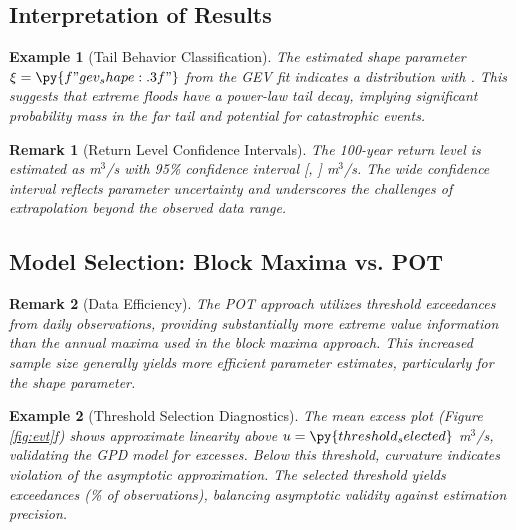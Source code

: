 \documentclass[a4paper, 11pt]{article}
\newtheorem{example}{Example}[section]
\newtheorem{remark}{Remark}[section]
\begin{document}
\subsection{Interpretation of Results}

\begin{example}[Tail Behavior Classification]
The estimated shape parameter $\xi = \py{f"{gev_shape:.3f}"}$ from the GEV fit indicates
a 
distribution with .
This suggests that extreme floods have a power-law tail decay, implying significant
probability mass in the far tail and potential for catastrophic events.
\end{example}

\begin{remark}[Return Level Confidence Intervals]
The 100-year return level is estimated as 
m$^3$/s with 95\% confidence interval [,
] m$^3$/s. The wide
confidence interval reflects parameter uncertainty and underscores the challenges of
extrapolation beyond the observed data range.
\end{remark}

\subsection{Model Selection: Block Maxima vs. POT}

\begin{remark}[Data Efficiency]
The POT approach utilizes  threshold exceedances from  daily
observations, providing substantially more extreme value information than the 
annual maxima used in the block maxima approach. This increased sample size generally
yields more efficient parameter estimates, particularly for the shape parameter.
\end{remark}

\begin{example}[Threshold Selection Diagnostics]
The mean excess plot (Figure \ref{fig:evt}f) shows approximate linearity above
$u = \py{threshold_selected}$ m$^3$/s, validating the GPD model for excesses. Below
this threshold, curvature indicates violation of the asymptotic approximation. The
selected threshold yields  exceedances (\% of
observations), balancing asymptotic validity against estimation precision.
\end{example}
\end{document}
